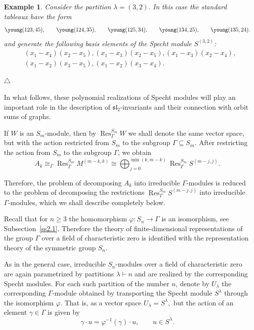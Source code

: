 \documentclass[12pt,reqno]{amsart}
\newtheorem{example}{Example}[section]
\begin{document}
\begin{example}{\rm

Consider the partition
$
\lambda=(3,2).
$
In this case the standard tableaux have the form
$$
\young(123,45),
\qquad
\young(124,35),
\qquad
\young(125,34),
\qquad
\young(134,25),
\qquad
\young(135,24).
$$
and generate the following basis elements of the Specht module $S^{(3,2)}$:
\begin{align*}
&(x_1-x_4)(x_2-x_5), (x_1-x_3)(x_2-x_5),(x_1-x_3)(x_2-x_4),\\
&(x_1-x_2)(x_3-x_5), (x_1-x_2)(x_3-x_4).
\end{align*}
}
$\triangle$ \end{example}

\medskip

In what follows, these polynomial realizations of Specht modules will play an
important role in the description of $\mathfrak{sl}_2$-invariants and their
connection with orbit sums of graphs.

If $W$ is an $S_m$-module, then by
$
\operatorname{Res}^{S_m}_{\Gamma} W
$
we shall denote the same vector space, but with the action restricted from
$S_m$ to the subgroup $\Gamma\subseteq S_m$.
After restricting the action from $S_m$ to the subgroup $\Gamma$, we obtain
\begin{equation}\label{Ak_Gamma_restriction}
A_k
\cong_\Gamma
\operatorname{Res}^{S_m}_{\Gamma} M^{(m-k,k)}
\cong
\bigoplus_{j=0}^{\min(k,m-k)}
\operatorname{Res}^{S_m}_{\Gamma} S^{(m-j,j)}.
\end{equation}

Therefore, the problem of decomposing $A_k$ into irreducible $\Gamma$-modules
is reduced to the problem of decomposing the restrictions
$
\operatorname{Res}^{S_m}_{\Gamma} S^{(m-j,j)}
$
into irreducible $\Gamma$-modules, which we shall describe completely below.

Recall that for $n\ge 3$ the homomorphism
$
\varphi:S_n\longrightarrow \Gamma
$
is an isomorphism, see Subsection~\ref{ss2.1}. Therefore the theory of
finite-dimensional representations of the group $\Gamma$ over a field of
characteristic zero is identified with the representation theory of the
symmetric group $S_n$.

As in the general case, irreducible $S_n$-modules over a field of
characteristic zero are again parametrized by partitions
$
\lambda\vdash n
$
and are realized by the corresponding Specht modules. For each such partition
of the number $n$, denote by $U_\lambda$ the corresponding $\Gamma$-module
obtained by transporting the Specht module $S^\lambda$ through the
isomorphism $\varphi$. That is, as a vector space
$
U_\lambda=S^\lambda,
$
but the action of an element $\gamma\in\Gamma$ is given by
$$
\gamma\cdot u
=
\varphi^{-1}(\gamma)\cdot u,
\qquad
u\in S^\lambda.
$$
\end{document}
